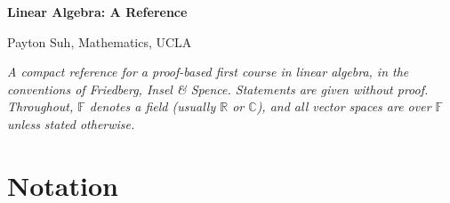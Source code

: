 \documentclass[12pt]{article}
\theoremstyle{definition}
\theoremstyle{remark}
\newcommand{\F}{\mathbb{F}}
\newcommand{\R}{\mathbb{R}}
\newcommand{\C}{\mathbb{C}}
\newcommand{\maketitleblock}[1]{{\noindent\Large\bfseries #1\par}\vspace{0.6em}}
\newenvironment{intro}{\itshape}{\par}
\begin{document}
\maketitleblock{Linear Algebra: A Reference}

Payton Suh, Mathematics, UCLA

\begin{intro}
A compact reference for a proof-based first course in linear algebra, in the conventions of
Friedberg, Insel \& Spence. Statements are given without proof. Throughout, $\F$ denotes a field
(usually $\R$ or $\C$), and all vector spaces are over $\F$ unless stated otherwise.
\end{intro}

\tableofcontents

\section{Notation}
\end{document}
